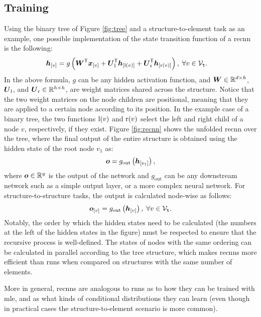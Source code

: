 \subsection{Training}
Using the binary tree of Figure \ref{fig:tree} and a structure-to-element task as an example, one possible implementation of the state transition function of a \gls{recnn} is the following:
\begin{align*}
    \Elem{h}{v} &= g\Par{\Matrix{W}^{\Transpose}\Elem{x}{v} + \Matrix{U}_\Fun{l}^{\Transpose}\Elem{h}{\Fun{l}(v)} + \Matrix{U}_\Fun{r}^{\Transpose}\Elem{h}{\Fun{r}(v)}},\; \forall v \in \Nodes_{\Tree}.
\end{align*}
In the above formula, $g$ can be any hidden activation function, and $\Matrix{w} \in \Real^{d \times h}$, $\Matrix{u}_\Fun{l}$, and $\Matrix{u}_\Fun{r} \in \Real^{h \times h}$, are weight matrices shared across the structure. Notice that the two weight matrices on the node children are positional, meaning that they are applied to a certain node according to its position. In the example case of a binary tree, the two functions $\mathrm{l}(v)$ and $\mathrm{r}(v)$ select the left and right child of a node $v$, respectively, if they exist. Figure \ref{fig:recnn} shows the unfolded \gls{recnn} over the tree, where the final output of the entire structure is obtained using the hidden state of the root node $v_1$ as:
$$\Vector{o} = g_{\mathrm{out}}\Par{\Elem{h}{v_1}},$$
where $\Vector{o} \in \Real^y$ is the output of the network and $g_{\mathrm{out}}$ can be any downstream network such as a simple output layer, or a more complex neural network. For structure-to-structure tasks, the output is calculated node-wise as follows:
$$\Elem{o}{v} = g_{\mathrm{out}}\Par{\Elem{h}{v}},\; \forall v \in \Nodes_{\Tree}.$$
Notably, the order by which the hidden states need to be calculated (the numbers at the left of the hidden states in the figure) must be respected to ensure that the recursive process is well-defined. The states of nodes with the same ordering can be calculated in parallel according to the tree structure, which makes \glspl{recnn} more efficient than \glspl{rnn} when compared on structures with the same number of elements.
\begin{figure*}[h!]
    \centering
    \resizebox{.5\textwidth}{!}{}
    \caption{A recursive neural network unfolded over the tree of Figure \ref{fig:tree} for a structure-to-element task. The number at the left of the hidden states indicates the order in which they are calculated. The black boxes represent  state vectors used to initialize the process at the leaves.}
    \label{fig:recnn}
\end{figure*}
More in general, \glspl{recnn} are analogous to \glspl{rnn} as to how they can be trained with \gls{mle}, and as what kinds of conditional distributions they can learn (even though in practical cases the structure-to-element scenario is more common).
